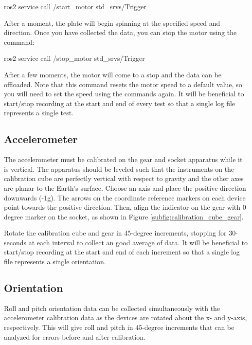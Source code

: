 \begin{bash}
    ros2 service call /start_motor std_srvs/Trigger
\end{bash}

\noindent After a moment, the plate will begin spinning at the specified speed and direction.
Once you have collected the data, you can stop the motor using the command:

\begin{bash}
    ros2 service call /stop_motor std_srvs/Trigger
\end{bash}

\noindent After a few moments, the motor will come to a stop and the data can be offloaded.
Note that this command resets the motor speed to a default value, so you will need to set the speed using the commands again.
It will be beneficial to start/stop recording at the start and end of every test so that a single log file represents a single test.

\subsection{Accelerometer} 
The accelerometer must be calibrated on the gear and socket apparatus while it is vertical.
The apparatus should be leveled such that the instruments on the calibration cube are perfectly vertical with respect to gravity and the other axes are planar to the Earth's surface.
Choose an axis and place the positive direction downwards (-1g).
The arrows on the coordinate reference markers on each device point towards the positive direction.
Then, align the indicator on the gear with 0-degree marker on the socket, as shown in Figure \ref{subfig:calibration_cube_gear}.

Rotate the calibration cube and gear in 45-degree increments, stopping for 30-seconds at each interval to collect an good average of data.
It will be beneficial to start/stop recording at the start and end of each increment so that a single log file represents a single orientation.

\subsection{Orientation} 
Roll and pitch orientation data can be collected simultaneously with the accelerometer calibration data as the devices are rotated about the x- and y-axis, respectively.
This will give roll and pitch in 45-degree increments that can be analyzed for errors before and after calibration.

